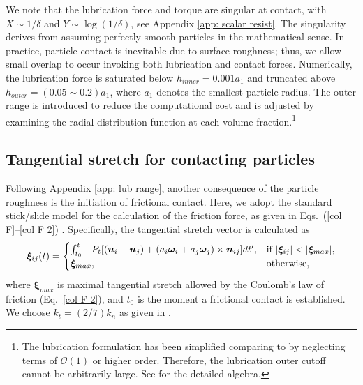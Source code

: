 We note that the lubrication force and torque are singular at contact, with $X \sim 1/\delta$ and $Y \sim \log (1/\delta)$, see Appendix \ref{app: scalar resist}. The singularity derives from assuming perfectly smooth particles in the mathematical sense. In practice, particle contact is inevitable due to surface roughness; thus, we allow small overlap to occur invoking both lubrication and contact forces. Numerically, the lubrication force is saturated below $h_{inner}=0.001a_1$ and truncated above $h_{outer}=(0.05\sim 0.2)a_1$, where $a_1$ denotes the smallest particle radius. The outer range is introduced to reduce the computational cost and is adjusted by examining the radial distribution function at each volume fraction.\footnote{The lubrication formulation has been simplified comparing to \cite{jeffrey_onishi_1984,jeffrey1992} by neglecting terms of $\mathcal{O}(1)$ or higher order. Therefore, the lubrication outer cutoff cannot be arbitrarily large. See \cite{ranga} for the detailed algebra.}


\subsection{Tangential stretch for contacting particles} \label{app: tang stretch}

Following Appendix \ref{app: lub range}, another consequence of the particle roughness is the initiation of frictional contact. Here, we adopt the standard stick/slide model for the calculation of the friction force, as given in Eqs.\ (\ref{col F}--\ref{col F 2}) \citep{Cundall_Strack1979,Luding2008}. Specifically, the tangential stretch vector is calculated as
\begin{equation} 
  \begin{aligned}
    {\bm \xi}_{ij}(t)= 
    \begin{cases}
      \int_{t_0}^t -P_t
      [({\bm u}_i-{\bm u}_j)+(a_i{\bm \omega}_i+a_j{\bm \omega}_j) \times {\bm n}_{ij}] dt', 
      & \text{if } \lvert{\bm \xi}_{ij}\rvert < \lvert{\bm \xi}_{max}\rvert, \\
      {\bm \xi}_{max} , & \text{otherwise},
    \end{cases}
  \end{aligned}
  \label{tang stretch}
\end{equation}
where ${\bm \xi}_{max}$ is maximal tangential stretch allowed by the Coulomb's law of friction (Eq.\ \ref{col F 2}), and $t_0$ is the moment a frictional contact is established. We choose $k_t=(2/7)k_n$ as given in \cite{Cheal_Ness_2018}.
